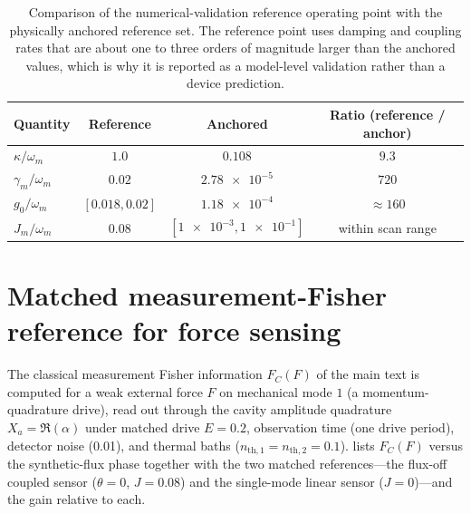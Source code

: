 \documentclass[aip,cha,reprint]{revtex4-2}
\begin{document}
\begin{table}[h]
  \centering
  \caption{Comparison of the numerical-validation reference operating point with the
  physically anchored reference set. The reference point uses damping and coupling rates that are
  about one to three orders of magnitude larger than the anchored values, which is why
  it is reported as a model-level validation rather than a device prediction.}
  \label{tab:si-pilot-vs-anchor}
  \begin{tabular}{@{}lccc@{}}
    \toprule
    Quantity & Reference & Anchored & Ratio (reference / anchor) \\
    \midrule
    $\kappa/\omega_m$ & $\num{1.0}$ & $\num{0.108}$ & $\num{9.3}$ \\
    $\gamma_m/\omega_m$ & $\num{0.02}$ & $\num{2.78e-5}$ & $\num{720}$ \\
    $g_0/\omega_m$ & $[\num{0.018},\num{0.02}]$ & $\num{1.18e-4}$ & $\approx\num{160}$ \\
    $J_m/\omega_m$ & $\num{0.08}$ & $[\num{1e-3},\num{1e-1}]$ & within scan range \\
    \bottomrule
  \end{tabular}
\end{table}

\section{Matched measurement-Fisher reference for force sensing}

The classical measurement Fisher information $F_C(F)$ of the main text is
computed for a weak external force $F$ on mechanical mode $1$ (a
momentum-quadrature drive), read out through the cavity amplitude quadrature
$X_a=\Re(\alpha)$ under matched drive $E=\num{0.2}$, observation time (one
drive period), detector noise (\num{0.01}), and thermal baths
($n_{\mathrm{th},1}=n_{\mathrm{th},2}=\num{0.1}$). 
lists $F_C(F)$ versus the synthetic-flux phase together with the two matched
references---the flux-off coupled sensor ($\theta=0$, $J=\num{0.08}$) and the
single-mode linear sensor ($J=0$)---and the gain relative to each.
\end{document}
